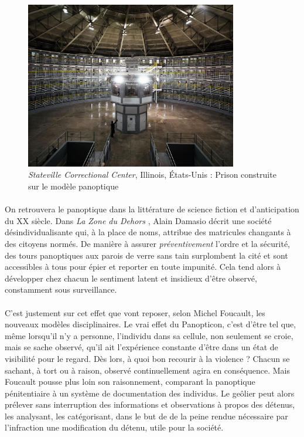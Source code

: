\begin{figure}[h]
    \centering
    \includegraphics[width=350px]{chapters/01/images/panoptique.jpg}
    \caption{\label{panoptique} \emph{Stateville Correctional Center}, Illinois, États-Unis : Prison construite sur le modèle panoptique}
\end{figure}

\paragraph{} On retrouvera le panoptique dans la littérature de science fiction et d'anticipation du XX siècle.
Dans \emph{La Zone du Dehors} \cite{Damasio0}, Alain Damasio décrit une société désindividualisante qui, à la place
de noms, attribue des matricules changants à des citoyens normés. De manière à assurer \emph{préventivement} l'ordre et la
sécurité, des tours panoptiques aux parois de verre sans tain surplombent la cité et sont accessibles à tous pour épier
et reporter en toute impunité. Cela tend alors à développer chez chacun le sentiment latent et insidieux d'être observé, 
constamment sous surveillance.

\paragraph{} C'est justement sur cet effet que vont reposer, selon Michel Foucault, les nouveaux modèles disciplinaires.
\guillemotleft Le vrai effet du Panopticon, c'est d'être tel que, même lorsqu'il n'y a personne, l'individu dans sa
cellule, non seulement se croie, mais se sache observé, qu'il ait l'expérience constante d'être dans un état de visibilité
pour le regard. \guillemotright \cite{Foucault0} Dès lors, à quoi bon recourir à la violence ? Chacun se sachant, à tort
ou à raison, observé continuellement agira en conséquence. Mais Foucault pousse plus loin son raisonnement, comparant la
panoptique pénitentiaire à un système de documentation des individus. Le geôlier peut alors prélever sans interruption
des informations et observations à propos des détenus, les analysant, les catégorisant, dans le but de \guillemotleft 
[Faire] de la peine rendue nécessaire par l'infraction une modification du détenu, utile pour la société. \guillemotright

